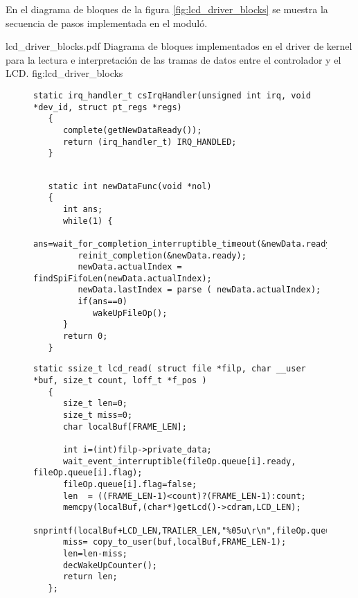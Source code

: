       En el diagrama de bloques de la figura \ref{fig:lcd_driver_blocks} se muestra la secuencia de pasos implementada en el moduló.
      
         {lcd_driver_blocks.pdf}
         {Diagrama de bloques implementados en el driver de kernel para la lectura e interpretación de las tramas de datos entre el controlador y el LCD.}
         {fig:lcd_driver_blocks}

\begin{figure}[h]
   \begin{lstlisting}[caption={Manejador de la interrupción asociada a una transacción SPI. Cuando es llamada activa toda la cadena de eventos que culmina con la actualizacion del estado de la pantalla.},label={cod:lcd_driver}]
   static irq_handler_t csIrqHandler(unsigned int irq, void *dev_id, struct pt_regs *regs)
   {
      complete(getNewDataReady());
      return (irq_handler_t) IRQ_HANDLED;
   }
   \end{lstlisting}
\end{figure}

\begin{figure}[h]
   \begin{lstlisting}[caption={},label={cod:lcd_driver},title={\lstlistingname~\thelstlisting: Tarea que espera en modo bloqueante una nueva trama de datos. Utiliza uno de los métodos de comunicación interprocesos del kernel de Linux.}]

   static int newDataFunc(void *nol)
   {
      int ans;
      while(1) {
         ans=wait_for_completion_interruptible_timeout(&newData.ready,msecs_to_jiffies(param_newDataTout));
         reinit_completion(&newData.ready);
         newData.actualIndex = findSpiFifoLen(newData.actualIndex);
         newData.lastIndex = parse ( newData.actualIndex);
         if(ans==0)
            wakeUpFileOp();
      }
      return 0;
   }
   \end{lstlisting}
\end{figure}

\begin{figure}[h]
   \begin{lstlisting}[name={caption},caption={},label=cod:lcd_driver,title={\lstlistingname~\thelstlisting: Función que bloquea a la espera de una operación de lectura desde el espacio de usuario. Cuando es llamada, copia la nueva informacion de la pantalla.}]
   static ssize_t lcd_read( struct file *filp, char __user *buf, size_t count, loff_t *f_pos )
   {
      size_t len=0;
      size_t miss=0;
      char localBuf[FRAME_LEN];

      int i=(int)filp->private_data;
      wait_event_interruptible(fileOp.queue[i].ready, fileOp.queue[i].flag);
      fileOp.queue[i].flag=false;
      len  = ((FRAME_LEN-1)<count)?(FRAME_LEN-1):count;
      memcpy(localBuf,(char*)getLcd()->cdram,LCD_LEN);
      snprintf(localBuf+LCD_LEN,TRAILER_LEN,"%05u\r\n",fileOp.queue[i].frameNumber++);
      miss= copy_to_user(buf,localBuf,FRAME_LEN-1);
      len=len-miss;
      decWakeUpCounter();
      return len;
   };
   \end{lstlisting}
\end{figure}

